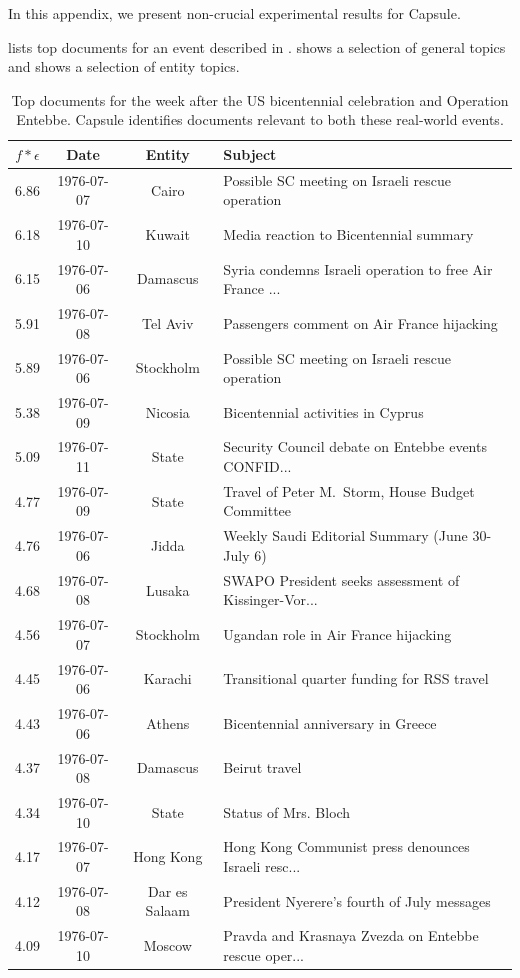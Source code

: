 
In this appendix, we present non-crucial experimental results for Capsule.

 lists top documents for an event described in .   shows a selection of general topics and  shows a selection of entity topics.


\begin{table}[tb]
\small
\centering
\begin{tabular}{cccl}
\toprule
$f *\epsilon$ & \textbf{Date} & \textbf{Entity} & \textbf{Subject} \\
\midrule
6.86 & 1976-07-07 & Cairo & Possible SC meeting on Israeli rescue operation \\
6.18 & 1976-07-10 & Kuwait & Media reaction to Bicentennial summary \\
6.15 & 1976-07-06 & Damascus & Syria condemns Israeli operation to free Air France ... \\
5.91 & 1976-07-08 & Tel Aviv & Passengers comment on Air France hijacking \\
5.89 & 1976-07-06 & Stockholm & Possible SC meeting on Israeli rescue operation \\
5.38 & 1976-07-09 & Nicosia & Bicentennial activities in Cyprus \\
5.09 & 1976-07-11 & State & Security Council debate on Entebbe events CONFID... \\
4.77 & 1976-07-09 & State & Travel of Peter M.~Storm, House Budget Committee \\
4.76 & 1976-07-06 & Jidda & Weekly Saudi Editorial Summary (June 30-July 6) \\
4.68 & 1976-07-08 & Lusaka & SWAPO President seeks assessment of Kissinger-Vor... \\
4.56 & 1976-07-07 & Stockholm & Ugandan role in Air France hijacking \\
4.45 & 1976-07-06 & Karachi & Transitional quarter funding for RSS travel \\
4.43 & 1976-07-06 & Athens & Bicentennial anniversary in Greece \\
4.37 & 1976-07-08 & Damascus & Beirut travel \\
4.34 & 1976-07-10 & State & Status of Mrs. Bloch \\
4.17 & 1976-07-07 & Hong Kong & Hong Kong Communist press denounces Israeli resc... \\
4.12 & 1976-07-08 & Dar es Salaam & President Nyerere's fourth of July messages \\
4.09 & 1976-07-10 & Moscow & Pravda and Krasnaya Zvezda on Entebbe rescue oper... \\
\bottomrule
\end{tabular}
\caption{Top documents for the week after the US bicentennial celebration and Operation Entebbe.  Capsule identifies documents relevant to both these real-world events.}
\label{tab:entebbe}
\end{table} 


